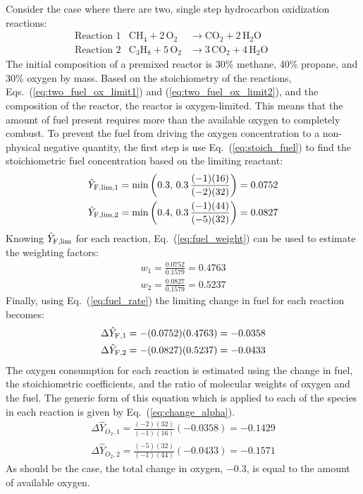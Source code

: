 Consider the case where there are two, single step hydrocarbon oxidization reactions:
\begin{align}
&\mbox{Reaction 1}& \mathrm{CH_4 + 2 \, O_2} &\rightarrow  \mathrm{CO_2 + 2 \, H_2O}       && && \label{eq:two_fuel_ox_limit1} \\
&\mbox{Reaction 2}& \mathrm{C_3H_8 + 5 \, O_2} &\rightarrow \mathrm{3 \,CO_2 + 4 \, H_2O}  && && \label{eq:two_fuel_ox_limit2}
\end{align}
The initial composition of a premixed reactor is 30\% methane, 40\% propane, and 30\% oxygen by mass. Based on the stoichiometry of the reactions, Eqs.~(\ref{eq:two_fuel_ox_limit1}) and (\ref{eq:two_fuel_ox_limit2}), and the composition of the reactor, the reactor is oxygen-limited. This means that the amount of fuel present requires more than the available oxygen to completely combust. To prevent the fuel from driving the oxygen concentration to a non-physical negative quantity, the first step is use Eq.~(\ref{eq:stoich_fuel}) to find the stoichiometric fuel concentration based on the limiting reactant:
\begin{align}
\hat{Y}_{{\rm F,lim},1} = \min \left (0.3,\,0.3\,\frac{(-1) (16)}{(-2)(32)} \right) = 0.0752 \\
\hat{Y}_{{\rm F,lim},2} = \min \left (0.4,\,0.3\,\frac{(-1) (44)}{(-5)(32)} \right) = 0.0827
\end{align}
Knowing $\hat{Y}_{\rm F,lim}$ for each reaction, Eq.~(\ref{eq:fuel_weight}) can be used to estimate the weighting factors:
\begin{align}
w_1 =  \frac{0.0752}{0.1579} = 0.4763 \\
w_2 =  \frac{0.0827}{0.1579} = 0.5237
\end{align}
Finally, using Eq.~(\ref{eq:fuel_rate}) the limiting change in fuel for each reaction becomes:
\begin{align}
\Delta \hat{Y}_{{\rm F},1} = - (0.0752)(0.4763) = -0.0358 \\
\Delta \hat{Y}_{{\rm F},2} = - (0.0827)(0.5237) = -0.0433
\end{align}
The oxygen consumption for each reaction is estimated using the change in fuel, the stoichiometric coefficients, and the ratio of molecular weights of oxygen and the fuel. The generic form of this equation which is applied to each of the species in each reaction is given by Eq.~(\ref{eq:change_alpha}).
\begin{align}
\Delta \hat{Y}_{\si{O_2},1} = \frac{(-2)(32)}{(-1)(16)}(-0.0358) = -0.1429 \\
\Delta \hat{Y}_{\si{O_2},2} = \frac{(-5)(32)}{(-1)(44)}(-0.0433) = -0.1571
\end{align}
As should be the case, the total change in oxygen, $-0.3$, is equal to the amount of available oxygen.

